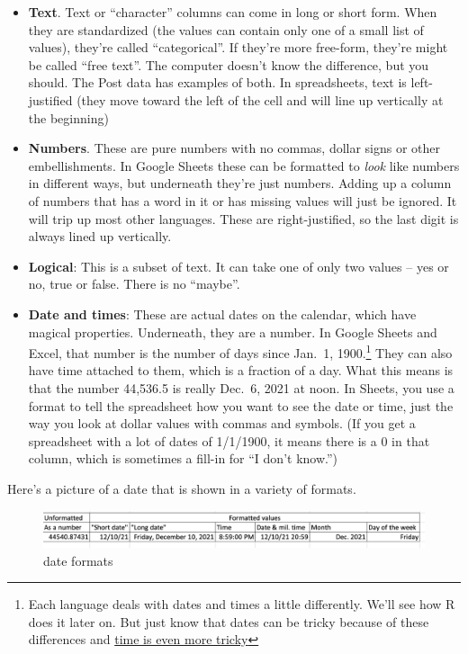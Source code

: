 \documentclass[
  letterpaper,
  DIV=11,
  numbers=noendperiod]{scrreprt}
\begin{document}
\begin{itemize}
\item
  \textbf{Text}. Text or ``character'' columns can come in long or short
  form. When they are standardized (the values can contain only one of a
  small list of values), they're called ``categorical''. If they're more
  free-form, they're might be called ``free text''. The computer doesn't
  know the difference, but you should. The Post data has examples of
  both. In spreadsheets, text is left-justified (they move toward the
  left of the cell and will line up vertically at the beginning)
\item
  \textbf{Numbers}. These are pure numbers with no commas, dollar signs
  or other embellishments. In Google Sheets these can be formatted to
  \emph{look} like numbers in different ways, but underneath they're
  just numbers. Adding up a column of numbers that has a word in it or
  has missing values will just be ignored. It will trip up most other
  languages. These are right-justified, so the last digit is always
  lined up vertically.
\item
  \textbf{Logical}: This is a subset of text. It can take one of only
  two values -- yes or no, true or false. There is no ``maybe''.
\item
  \textbf{Date and times}: These are actual dates on the calendar, which
  have magical properties. Underneath, they are a number. In Google
  Sheets and Excel, that number is the number of days since Jan.~1,
  1900.\footnote{Each language deals with dates and times a little
    differently. We'll see how R does it later on. But just know that
    dates can be tricky because of these differences and
    \href{https://infiniteundo.com/post/25326999628/falsehoods-programmers-believe-about-time}{time
    is even more tricky}} They can also have time attached to them,
  which is a fraction of a day. What this means is that the number
  44,536.5 is really Dec.~6, 2021 at noon. In Sheets, you use a format
  to tell the spreadsheet how you want to see the date or time, just the
  way you look at dollar values with commas and symbols. (If you get a
  spreadsheet with a lot of dates of 1/1/1900, it means there is a 0 in
  that column, which is sometimes a fill-in for ``I don't know.'')
\end{itemize}

Here's a picture of a date that is shown in a variety of formats.

\begin{figure}

{\centering \includegraphics[width=1\textwidth,height=\textheight]{./images/xl-filter-sort-dates.png}

}

\caption{date formats}

\end{figure}
\end{document}
